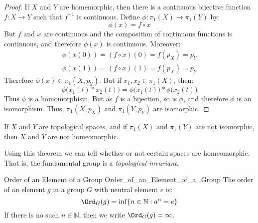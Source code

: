 \documentclass{book}                                                           %
\begin{document}
            \begin{proof}
                If $X$ and $Y$ are homemorphic, then there is
                a continuous bijective function
                $f:X\rightarrow{Y}$ such that
                $f^{-1}$ is continuous. Define
                $\phi:\pi_{1}(X)\rightarrow\pi_{1}(Y)$ by:
                \begin{equation}
                    \phi(x)=f\circ{x}
                \end{equation}
                But $f$ and $x$ are continuous and the composition
                of continuous functions is continuous, and therefore
                $\phi(x)$ is continuous. Moreover:
                \begin{align}
                    \phi(x(0))=(f\circ{x})(0)=f(p_{X})=p_{Y}\\
                    \phi(x(1))=(f\circ{x})(1)=f(p_{X})=p_{Y}
                \end{align}
                Therefore $\phi(x)\in\pi_{1}(X,p_{Y})$.
                But if $x_{1},x_{2}\in\pi_{1}(X)$, then:
                \begin{equation}
                    \phi\big(x_{1}(t)*x_{2}(t)\big)
                    =\phi\big(x_{1}(t)\big)*\phi\big(x_{2}(t)\big)
                \end{equation}
                Thus
                $\phi$ is a homomorphism. But as
                $f$ is a bijection, so is $\phi$, and
                therefore $\phi$ is an isomorphism.
                Thus, $\pi_{1}(X,p_{X})$ and
                $\pi_{1}(Y,p_{Y})$ are isomorphic.
            \end{proof}
            \begin{theorem}
                If $X$ and $Y$ are topological spaces, and if $\pi_{1}(X)$ and
                $\pi_{1}(Y)$ are not isomorphic, then
                $X$ and $Y$ are not homeomorphic.
            \end{theorem}
            Using this theorem we can tell whether or not
            certain spaces are homeomorphic. That is,
            the fundamental group is a
            \textit{topological invariant}.
            \begin{ldefinition}{Order of an Element of a Group}
                               {Order_of_an_Element_of_a_Group}
                The order of an element $g$ in a group $G$
                with neutral element $e$ is:
                \begin{equation}
                    \Ord_{G}(g)=\inf\{n\in\mathbb{N}:a^{n}=e\}
                \end{equation}
                If there is no such $n\in\mathbb{N}$, then we write
                $\Ord_{G}(g)=\infty$.
            \end{ldefinition}
\end{document}
